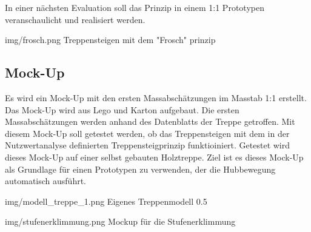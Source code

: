 In einer nächsten Evaluation soll das Prinzip in einem 1:1 Prototypen veranschaulicht und realisiert werden.

\image
 {img/frosch.png}
 {Treppensteigen mit dem "Frosch" prinzip}

\subsection*{Mock-Up}
 Es wird ein Mock-Up mit den ersten Massabschätzungen im Masstab 1:1 erstellt. Das Mock-Up wird aus Lego und Karton aufgebaut. Die ersten Massabschätzungen werden anhand des Datenblatts der Treppe getroffen. Mit diesem Mock-Up soll getestet werden, ob das Treppensteigen mit dem in der Nutzwertanalyse definierten Treppensteigprinzip funktioiniert. Getestet wird dieses Mock-Up auf einer selbst gebauten Holztreppe.
 Ziel ist es dieses Mock-Up als Grundlage für einen Prototypen zu verwenden, der die Hubbewegung automatisch ausführt.
 
 \imagewidth
   {img/modell_treppe_1.png}
   {Eigenes Treppenmodell}
   {0.5\textwidth}

 \image
   {img/stufenerklimmung.png}
   {Mockup für die Stufenerklimmung}
   
\newpage